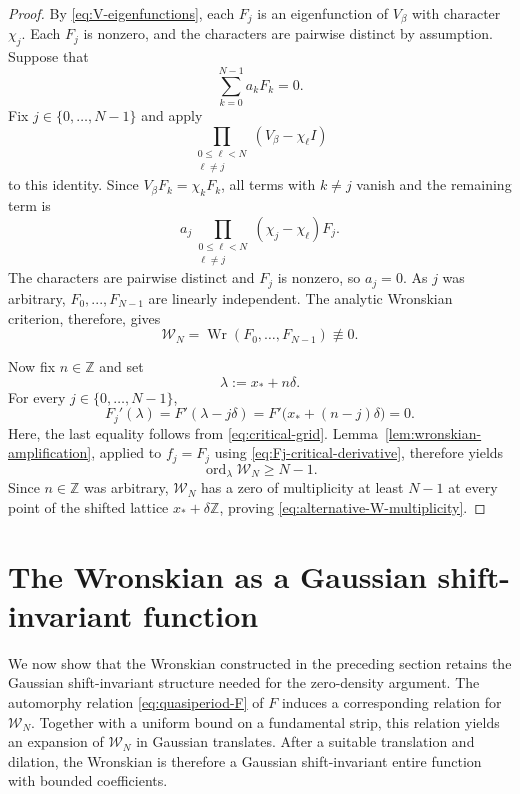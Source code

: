 \documentclass[11pt]{amsart}
\numberwithin{equation}{section}
\theoremstyle{definition}
\theoremstyle{remark}
\newcommand{\Z}{\mathbb Z}
\newcommand{\cW}{\mathcal W}
\newcommand{\Wr}{\operatorname{Wr}}
\newcommand{\ord}{\operatorname{ord}}
\begin{document}
\begin{proof}
By \eqref{eq:V-eigenfunctions}, each $F_j$ is an eigenfunction of $V_\beta$ with character $\chi_j$. Each $F_j$ is nonzero, and the characters are pairwise distinct by assumption. Suppose that 
\begin{equation}
    \sum_{k=0}^{N-1}a_kF_k=0. 
\end{equation}
Fix $j\in\{0,\ldots,N-1\}$ and apply
\begin{equation}
    \prod_{\substack{0\leq\ell<N \\ \ell\neq j}} (V_\beta-\chi_\ell I)
\end{equation}
to this identity. Since $V_\beta F_k=\chi_kF_k$, all terms with $k\neq j$ vanish and the remaining term is
\begin{equation}
    a_j \prod_{\substack{0\leq\ell<N \\ \ell\neq j}} (\chi_j-\chi_\ell)F_j.
\end{equation}
The characters are pairwise distinct and $F_j$ is nonzero, so $a_j=0$. As $j$ was arbitrary, $F_0,...,F_{N-1}$ are linearly independent. The analytic Wronskian criterion, therefore, gives
\begin{equation}\label{eq:alternative-Wronskian-nonzero}
    \cW_N
    =
    \Wr(F_0,\ldots,F_{N-1})
    \not\equiv0.
\end{equation}

Now fix $n\in\Z$ and set
\begin{equation}
    \lambda:=x_*+n\delta.
\end{equation}
For every $j\in\{0,\ldots,N-1\}$,
\begin{equation}\label{eq:Fj-critical-derivative}
    F_j'(\lambda)
    =
    F'(\lambda-j\delta)
    =
    F'\bigl(x_*+(n-j)\delta\bigr)
    =
    0.
\end{equation}
Here, the last equality follows from \eqref{eq:critical-grid}. Lemma~\ref{lem:wronskian-amplification}, applied to $f_j=F_j$ using \eqref{eq:Fj-critical-derivative}, therefore yields
\begin{equation}\label{eq:alternative-local-multiplicity}
    \ord_{\lambda}\cW_N\geq N-1.
\end{equation}
Since $n\in\Z$ was arbitrary, $\cW_N$ has a zero of multiplicity at least $N-1$ at every point of the shifted lattice $x_*+\delta\Z$, proving \eqref{eq:alternative-W-multiplicity}.
\end{proof}

\section{The Wronskian as a Gaussian shift-invariant function}\label{sec:Wronskian_SI_function}
We now show that the Wronskian constructed in the preceding section retains the Gaussian shift-invariant structure needed for the zero-density argument. The automorphy relation \eqref{eq:quasiperiod-F} of $F$ induces a corresponding relation for $\cW_N$. Together with a uniform bound on a fundamental strip, this relation yields an expansion of $\cW_N$ in Gaussian translates. After a suitable translation and dilation, the Wronskian is therefore a Gaussian shift-invariant entire function with bounded coefficients.
\end{document}
